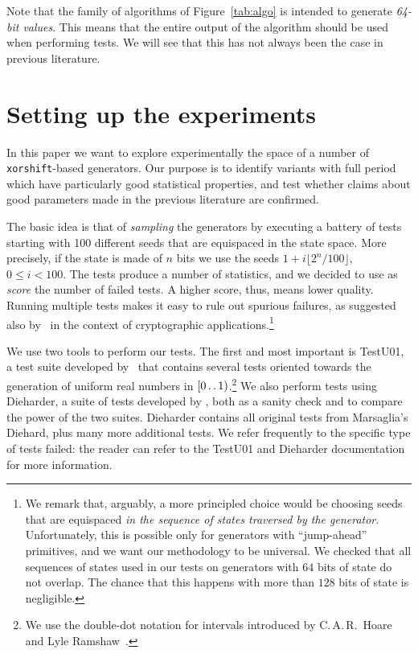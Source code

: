 \documentclass{acmsmalltr}
\def\..{\,\mathpunct{\ldotp\ldotp}}
\newcommand{\xorshift}[1][]{\texttt{xorshift#1}\xspace}
\begin{document}
Note that the family of algorithms of Figure~\ref{tab:algo} is intended to
generate \emph{64-bit values}. This means that the entire output of the
algorithm should be used when performing tests. We will see that this has not
always been the case in previous literature.


\section{Setting up the experiments}
\label{sec:setup}

In this paper we want to explore experimentally the space of a number of
\xorshift-based generators. Our purpose is to identify variants
with full period which have particularly good statistical properties, and test
whether claims about good parameters made in the previous literature are
confirmed.

The basic idea is that of \emph{sampling} the generators by executing a battery
of tests starting with 100 different seeds that are equispaced in the state
space. More precisely, if the state is made of $n$ bits we
use the seeds $1+i\lfloor 2^{n}/100\rfloor$, $0\leq i<100$. The tests produce a
number of statistics, and we decided to use as \emph{score} the number of failed
tests. A higher score, thus, means lower quality.
Running multiple tests makes it easy to rule out spurious failures, as suggested
also by~ in the context of cryptographic
applications.\footnote{We remark that, arguably, a more principled
choice would be choosing seeds that are equispaced \emph{in the sequence of states
traversed by the generator}. Unfortunately, this is possible only for
generators with ``jump-ahead'' primitives, and we want our methodology to be
universal. We checked that all sequences of states used in our tests
on generators with $64$ bits of state do not overlap. The chance that this
happens with more than $128$ bits of state is negligible.}

We use two tools to perform our tests. The first and most important is
TestU01, a test suite developed by~ that
contains several tests oriented towards the generation of uniform real numbers
in $[0\..1)$.\footnote{We use the double-dot notation for intervals introduced
by C.\,A.\,R.~Hoare and Lyle Ramshaw~\cite{GKPCM}.}
We also perform tests using Dieharder, a suite of tests developed by , both as a sanity check and to compare the power of the two suites. 
Dieharder contains all original tests from Marsaglia's
Diehard, plus many more additional tests.
We refer frequently to the specific type of tests failed:
the reader can refer to the TestU01 and Dieharder documentation for more
information. 
\end{document}
